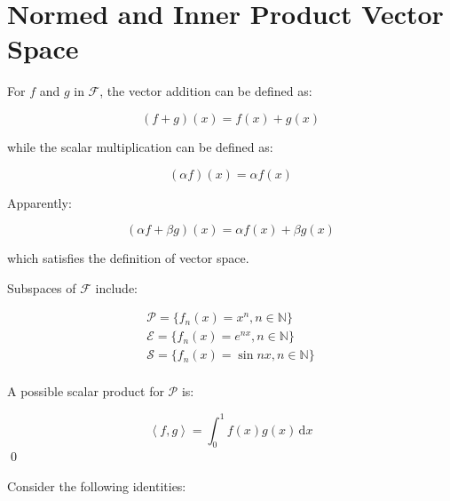 \documentclass[12pt]{article}
\begin{document}



\pagebreak
\section*{Normed and Inner Product Vector Space}



For $f$ and $g$ in $\mathcal{F}$, the vector addition can be defined as:

\begin{equation}
    (f + g)(x) = f(x) + g(x)
\end{equation}

while the scalar multiplication can be defined as:

\begin{equation}
    (\alpha f)(x) = \alpha f(x)
\end{equation}

Apparently:

\begin{equation}
    (\alpha f + \beta g)(x) = \alpha f(x) + \beta g(x)
\end{equation}

which satisfies the definition of vector space.


Subspaces of $\mathcal{F}$ include:

\begin{equation}
\begin{split}
    \mathcal{P} = \{f_{n}(x) = x^n, n \in \mathbb{N}\} \\
    \mathcal{E} = \{f_{n}(x) = e^{nx}, n \in \mathbb{N}\} \\
    \mathcal{S} = \{f_{n}(x) = \sin{nx}, n \in \mathbb{N}\} \\
\end{split}
\end{equation}


A possible scalar product for $\mathcal{P}$ is:

\begin{equation}
    \left\langle f, g \right\rangle = \int_{0}^{1} f(x) g(x) \, \mathrm{d}x
\end{equation}
\qed



Consider the following identities:
\end{document}

